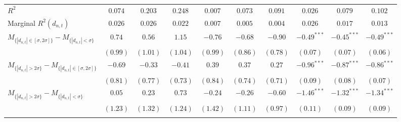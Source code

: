 \begin{tabular}{lccccccccc}
  $R^2$ & $0.074$ & $0.203$ & $0.248$ & $0.007$ & $0.073$ & $0.091$ & $0.026$ & $0.079$ & $0.102$ \\ 
  Marginal $R^2(d_{n,t})$ & $0.026$ & $0.026$ & $0.022$ & $0.007$ & $0.005$ & $0.004$ & $0.026$ & $0.017$ & $0.013$ \\ 
 \hline
  $M_{\{|d_{n,t}| \in [\sigma, 2\sigma]\}} - M_{\{|d_{n,t}| < \sigma\}}$ & $0.74$ & $0.56$ & $1.15$ & $-0.76$ & $-0.68$ & $-0.90$ & $-0.49^{***}$ & $-0.45^{***}$ & $-0.49^{***}$ \\ 
   & $(0.99)$ & $(1.01)$ & $(1.04)$ & $(0.99)$ & $(0.86)$ & $(0.78)$ & $(0.07)$ & $(0.07)$ & $(0.06)$ \\ 
  $M_{\{|d_{n,t}| > 2 \sigma\}} - M_{\{|d_{n,t}| \in [\sigma, 2\sigma]\}}$ & $-0.69$ & $-0.33$ & $-0.41$ & $0.39$ & $0.37$ & $0.27$ & $-0.96^{***}$ & $-0.87^{***}$ & $-0.86^{***}$ \\ 
   & $(0.81)$ & $(0.77)$ & $(0.73)$ & $(0.84)$ & $(0.74)$ & $(0.71)$ & $(0.09)$ & $(0.08)$ & $(0.07)$ \\ 
  $M_{\{|d_{n,t}| > 2 \sigma\}} - M_{\{|d_{n,t}| < \sigma\}}$ & $0.05$ & $0.23$ & $0.73$ & $-0.24$ & $-0.26$ & $-0.60$ & $-1.46^{***}$ & $-1.32^{***}$ & $-1.34^{***}$ \\ 
   & $(1.23)$ & $(1.32)$ & $(1.24)$ & $(1.42)$ & $(1.11)$ & $(0.97)$ & $(0.11)$ & $(0.09)$ & $(0.09)$ \\ \vspace{5pt} 
   \hline 
\end{tabular}

